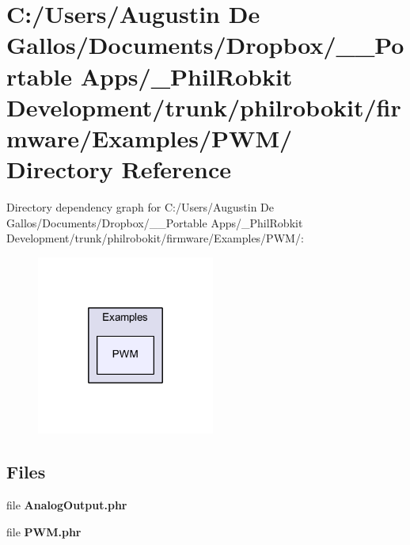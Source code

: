 \section{C\-:/\-Users/\-Augustin De Gallos/\-Documents/\-Dropbox/\-\_\-\-\_\-\-Portable Apps/\-\_\-\-Phil\-Robkit Development/trunk/philrobokit/firmware/\-Examples/\-P\-W\-M/ Directory Reference}
\label{dir_265314f145fedf67d5698a7f49889b15}
Directory dependency graph for C\-:/\-Users/\-Augustin De Gallos/\-Documents/\-Dropbox/\-\_\-\-\_\-\-Portable Apps/\-\_\-\-Phil\-Robkit Development/trunk/philrobokit/firmware/\-Examples/\-P\-W\-M/\-:\nopagebreak
\begin{figure}[H]
\begin{center}
\leavevmode
\includegraphics[width=166pt]{dir_265314f145fedf67d5698a7f49889b15_dep}
\end{center}
\end{figure}
\subsection*{Files}
\begin{DoxyCompactItemize}
\item 
file {\bf Analog\-Output.\-phr}
\item 
file {\bf P\-W\-M.\-phr}
\end{DoxyCompactItemize}
